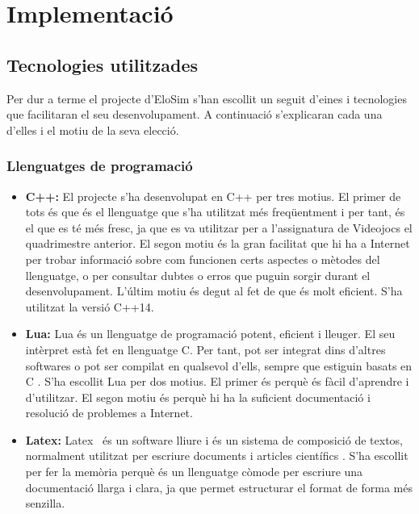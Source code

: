 \documentclass[a4paper]{article}
\begin{document}
\newpage
\section{Implementació}
\subsection{Tecnologies utilitzades}
Per dur a terme el projecte d'EloSim s'han escollit un seguit d'eines i tecnologies que facilitaran el seu desenvolupament. A continuació s'explicaran cada una d'elles i el motiu de la seva elecció.

\subsubsection{Llenguatges de programació}
\begin{itemize}
    \item \textbf{C++:} El projecte s'ha desenvolupat en C++ per tres motius. El primer de tots és que és el llenguatge que s'ha utilitzat més freqüentment i per tant, és el que es té més fresc, ja que es va utilitzar per a l'assignatura de Videojocs el quadrimestre anterior. El segon motiu és la gran facilitat que hi ha a Internet per trobar informació sobre com funcionen certs aspectes o mètodes del llenguatge, o per consultar dubtes o erros que puguin sorgir durant el desenvolupament. L'últim motiu és degut al fet de que és molt eficient. S'ha utilitzat la versió C++14.
    \item \textbf{Lua:} Lua és un llenguatge de programació potent, eficient i lleuger. El seu intèrpret està fet en llenguatge C. Per tant, pot ser integrat dins d'altres softwares o pot ser compilat en qualsevol d'ells, sempre que estiguin basats en C \cite{luaAbout}. S'ha escollit Lua per dos motius. El primer és perquè és fàcil d'aprendre i d'utilitzar. El segon motiu és perquè hi ha la suficient documentació i resolució de problemes a Internet. 
    \item \textbf{Latex:} Latex \, és un software lliure i és un sistema de composició de textos, normalment utilitzat per escriure documents i articles científics \cite{wikipediaLatex}. S'ha escollit per fer la memòria perquè és un llenguatge còmode per escriure una documentació llarga i clara, ja que permet estructurar el format de forma més senzilla.
\end{itemize}
\end{document}
